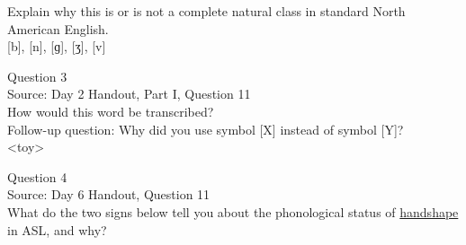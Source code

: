 \documentclass[12pt]{article}
\begin{document}
Explain why this is or is not a complete natural class in standard North American English.\\

{[b]}, {[n]}, {[ɡ]}, {[ʒ]}, {[v]}


\newpage

{\large Question 3}\\

Source: Day 2 Handout, Part I, Question 11\\

How would this word be transcribed?\\ Follow-up question: Why did you use symbol [X] instead of symbol [Y]?\\

<toy>


\newpage

{\large Question 4}\\

Source: Day 6 Handout, Question 11\\

What do the two signs below tell you about the phonological status of \underline{handshape} in ASL, and why?\\
\end{document}
